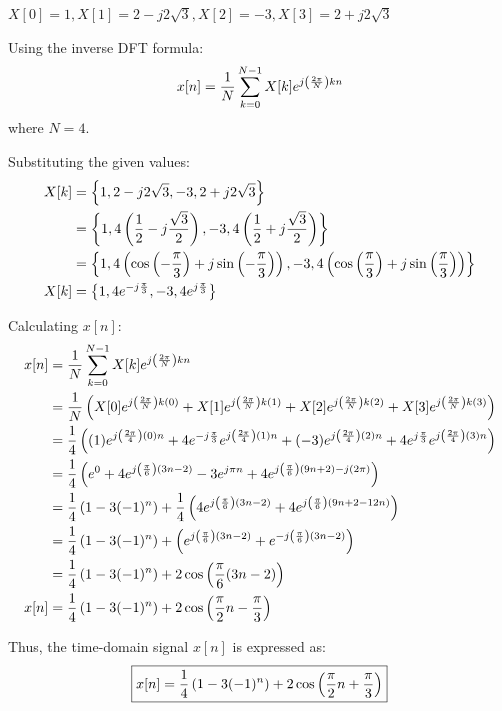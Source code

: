 \documentclass[a4paper, 10pt]{article}
\begin{document}
\newpage

\begin{tosubmit}
\begin{subsubproblems}[start=3]
    \item \( X[0] = 1, X[1] = 2 - j 2\sqrt{3}, X[2] = -3, X[3] = 2 + j 2\sqrt{3} \)
\end{subsubproblems}

\par\noindent\submitsolution
Using the inverse DFT formula:
\[ x[n] = \frac{1}{N} \sum_{k=0}^{N-1} X[k] e^{j \left( \frac{2\pi}{N} \right) kn} \]
where \( N = 4 \).

\vspace{2mm}

Substituting the given values:
\begin{align*}
    X[k] &= \left\{ 1, 2 - j 2\sqrt{3}, -3, 2 + j 2\sqrt{3} \right\} \\
    &= \left\{ 1, 4 \left( \frac{1}{2} - j \frac{\sqrt{3}}{2} \right), -3, 4 \left( \frac{1}{2} + j \frac{\sqrt{3}}{2} \right) \right\} \\
    &= \left\{ 1, 4 \left( \cos{ \left( -\frac{\pi}{3} \right) } + j \sin{ \left( -\frac{\pi}{3} \right) } \right), -3, 4 \left( \cos{ \left( \frac{\pi}{3} \right) } + j \sin{ \left( \frac{\pi}{3} \right) } \right) \right\} \\
    X[k] &= \left\{ 1, 4 e^{-j\frac{\pi}{3}}, -3, 4 e^{j\frac{\pi}{3}} \right\}
\end{align*}

Calculating \( x[n] \):
\begin{align*}
    x[n] &= \frac{1}{N} \sum_{k=0}^{N-1} X[k] e^{j \left( \frac{2\pi}{N} \right) kn} \\
    &= \frac{1}{N} \left( X[0] e^{j \left( \frac{2\pi}{N} \right) k(0)} + X[1] e^{j \left( \frac{2\pi}{N} \right) k(1)} + X[2] e^{j \left( \frac{2\pi}{N} \right) k(2)} + X[3] e^{j \left( \frac{2\pi}{N} \right) k(3)} \right) \\
    &= \frac{1}{4} \left( (1) e^{j \left( \frac{2\pi}{4} \right) ( 0 ) n} + 4 e^{-j\frac{\pi}{3}} e^{j \left( \frac{2\pi}{4} \right) ( 1 ) n} + (-3) e^{j \left( \frac{2\pi}{4} \right) ( 2 ) n} + 4 e^{j\frac{\pi}{3}} e^{j \left( \frac{2\pi}{4} \right) ( 3 ) n} \right) \\
    &= \frac{1}{4} \left( e^{ 0 } + 4 e^{j \left( \frac{\pi}{6} \right) (3n - 2)} - 3 e^{j \pi n} + 4 e^{j \left( \frac{\pi}{6} \right) (9n + 2) - j ( 2 \pi )} \right) \\
    &= \frac{1}{4} \left( 1 - 3(-1)^n \right) + \frac{1}{4} \left( 4 e^{j \left( \frac{\pi}{6} \right) (3n - 2)} + 4 e^{j \left( \frac{\pi}{6} \right) (9n + 2 - 12n)} \right) \\
    &= \frac{1}{4} \left( 1 - 3(-1)^n \right) + \left( e^{j \left( \frac{\pi}{6} \right) (3n - 2)} + e^{-j \left( \frac{\pi}{6} \right) (3n - 2)} \right) \\
    &= \frac{1}{4} \left( 1 - 3(-1)^n \right) + 2 \cos{\left( \frac{\pi}{6} (3n - 2)\right) } \\
    x[n] &= \frac{1}{4} \left( 1 - 3(-1)^n \right) + 2 \cos{\left( \frac{\pi}{2} n - \frac{\pi}{3}\right) }
\end{align*}

Thus, the time-domain signal \( x[n] \) is expressed as:
\[ \boxed{ x[n] = \frac{1}{4} \left( 1 - 3(-1)^n \right) + 2 \cos{\left( \frac{\pi}{2} n + \frac{\pi}{3}\right) } } \]
\end{tosubmit}
\end{document}
